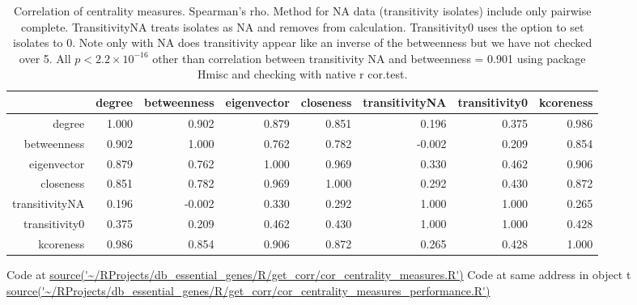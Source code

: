 \begin{table}[ht]
\centering
\setlength{\extrarowheight}{2pt}
\begin{adjustbox}{width=\textwidth}
\begin{tabular}{rrrrrrrr}
  \toprule
 & degree & betweenness & eigenvector & closeness & transitivityNA & transitivity0 & kcoreness \\ 
  \midrule
degree & 1.000 & 0.902 & 0.879 & 0.851 & 0.196 & 0.375 & 0.986 \\ 
  betweenness & 0.902 & 1.000 & 0.762 & 0.782 & -0.002 & 0.209 & 0.854 \\ 
  eigenvector & 0.879 & 0.762 & 1.000 & 0.969 & 0.330 & 0.462 & 0.906 \\ 
  closeness & 0.851 & 0.782 & 0.969 & 1.000 & 0.292 & 0.430 & 0.872 \\ 
  transitivityNA & 0.196 & -0.002 & 0.330 & 0.292 & 1.000 & 1.000 & 0.265 \\ 
  transitivity0 & 0.375 & 0.209 & 0.462 & 0.430 & 1.000 & 1.000 & 0.428 \\ 
  kcoreness & 0.986 & 0.854 & 0.906 & 0.872 & 0.265 & 0.428 & 1.000 \\ 
   \bottomrule
 
   
\end{tabular}
\end{adjustbox}
\caption[Correlation of centrality measures]{Correlation of centrality measures. Spearman's rho. Method for NA data (transitivity isolates) include only pairwise complete. TransitivityNA treats isolates as NA and removes from calculation. Transitivity0 uses the option to set isolates to 0. Note only with NA does transitivity appear like an inverse of the betweenness but we have not checked over 5.  All $p<2.2 \times 10^{-16}$ other than correlation between transitivity NA and betweenness = 0.901 using package Hmisc and checking with native r cor.test. } 
\tiny Code at \url{source('~/RProjects/db_essential_genes/R/get_corr/cor_centrality_measures.R')}
\tiny Code at same address in object t \url{source('~/RProjects/db_essential_genes/R/get_corr/cor_centrality_measures_performance.R')}
\label{tab:Correlation of centrality measures 2 transitvities}
\end{table}

